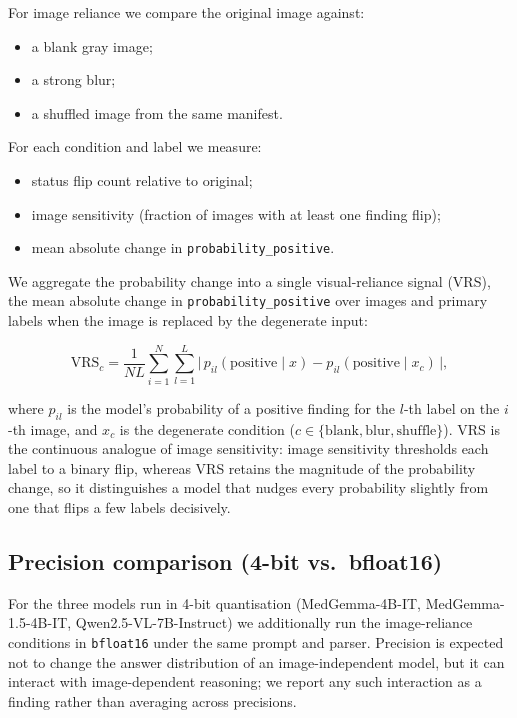 For image reliance we compare the original image against:

\begin{itemize}
\item a blank gray image;
\item a strong blur;
\item a shuffled image from the same manifest.
\end{itemize}

For each condition and label we measure:

\begin{itemize}
\item status flip count relative to original;
\item image sensitivity (fraction of images with at least one finding flip);
\item mean absolute change in \texttt{probability\_positive}.
\end{itemize}

We aggregate the probability change into a single visual-reliance signal (VRS), the mean absolute change in \texttt{probability\_positive} over images and primary labels when the image is replaced by the degenerate input:

\begin{equation}
\mathrm{VRS}_c = \frac{1}{N L}\sum_{i=1}^{N}\sum_{l=1}^{L}
\bigl|\,p_{il}(\mathrm{positive}\mid x) - p_{il}(\mathrm{positive}\mid x_c)\,\bigr|,
\end{equation}

where $p_{il}$ is the model's probability of a positive finding for the $l$-th label on the $i$-th image, and $x_c$ is the degenerate condition ($c \in \{\mathrm{blank}, \mathrm{blur}, \mathrm{shuffle}\}$). VRS is the continuous analogue of image sensitivity: image sensitivity thresholds each label to a binary flip, whereas VRS retains the magnitude of the probability change, so it distinguishes a model that nudges every probability slightly from one that flips a few labels decisively.

\subsection{Precision comparison (4-bit vs.\ bfloat16)}

For the three models run in 4-bit quantisation (MedGemma-4B-IT,
MedGemma-1.5-4B-IT, Qwen2.5-VL-7B-Instruct) we additionally run the
image-reliance conditions in \texttt{bfloat16} under the same prompt and parser.
Precision is expected not to change the answer distribution of an
image-independent model, but it can interact with image-dependent reasoning; we
report any such interaction as a finding rather than averaging across precisions.

